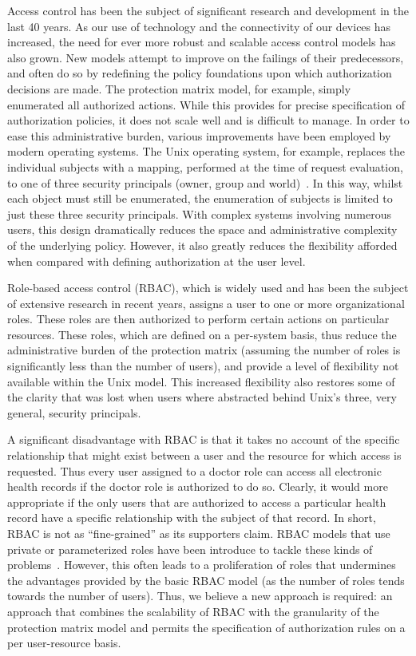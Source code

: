 \documentclass{article}
\begin{document}
Access control has been the subject of significant research and development in the last 40 years.
As our use of technology and the connectivity of our devices has increased, the need for ever more robust and scalable access control models has also grown.
New models attempt to improve on the failings of their predecessors, and often do so by redefining the policy foundations upon which authorization decisions are made.
The protection matrix model, for example, simply enumerated all authorized actions.
While this provides for precise specification of authorization policies, it does not scale well and is difficult to manage.
In order to ease this administrative burden, various improvements have been employed by modern operating systems.
The Unix operating system, for example, replaces the individual subjects with a mapping, performed at the time of request evaluation, to one of three security principals (owner, group and world)~\cite{Crampton_UnixAccessControl}.
In this way, whilst each object must still be enumerated, the enumeration of subjects is limited to just these three security principals.
With complex systems involving numerous users, this design dramatically reduces the space and administrative complexity of the underlying policy.
However, it also greatly reduces the flexibility afforded when compared with defining authorization at the user level.

Role-based access control (RBAC), which is widely used and has been the subject of extensive research in recent years, assigns a user to one or more organizational roles.
These roles are then authorized to perform certain actions on particular resources.
These roles, which are defined on a per-system basis, thus reduce the administrative burden of the protection matrix (assuming the number of roles is significantly less than the number of users), and provide a level of flexibility not available within the Unix model.
This increased flexibility also restores some of the clarity that was lost when users where abstracted behind Unix's three, very general, security principals.

A significant disadvantage with RBAC is that it takes no account of the specific relationship that might exist between a user and the resource for which access is requested.
Thus every user assigned to a doctor role can access all electronic health records if the doctor role is authorized to do so.
Clearly, it would more appropriate if the only users that are authorized to access a particular health record have a specific relationship with the subject of that record.
In short, RBAC is not as ``fine-grained'' as its supporters claim.
RBAC models that use private or parameterized roles have been introduce to tackle these kinds of problems~\cite{Ge_ParamRoles,Giuri_RT,Sandhu_RBAC}.
However, this often leads to a proliferation of roles that undermines the advantages provided by the basic RBAC model (as the number of roles tends towards the number of users).
Thus, we believe a new approach is required: an approach that combines the scalability of RBAC with the granularity of the protection matrix model and permits the specification of authorization rules on a per user-resource basis.
\end{document}
